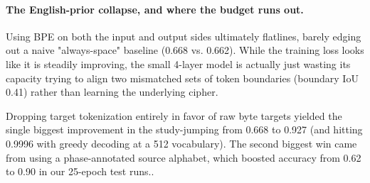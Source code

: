 \documentclass[12pt]{article}
\begin{document}
\paragraph{The English-prior collapse, and where the budget runs out.}
Using BPE on both the input and output sides ultimately flatlines, barely edging out a naive "always-space" baseline (0.668 vs. 0.662). While the training loss looks like it is steadily improving, the small 4-layer model is actually just wasting its capacity trying to align two mismatched sets of token boundaries (boundary IoU 0.41) rather than learning the underlying cipher.

Dropping target tokenization entirely in favor of raw byte targets yielded the single biggest improvement in the study-jumping from 0.668 to 0.927 (and hitting 0.9996 with greedy decoding at a 512 vocabulary). The second biggest win came from using a phase-annotated source alphabet, which boosted accuracy from 0.62 to 0.90 in our 25-epoch test runs..
\end{document}
